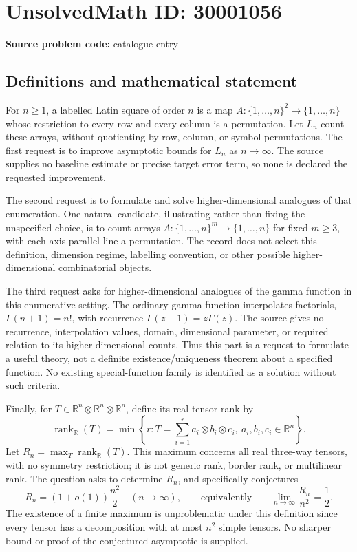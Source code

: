 \documentclass[11pt]{article}
\newcommand{\R}{\mathbb{R}}
\begin{document}
\section*{UnsolvedMath ID: 30001056}
\textbf{Source problem code:} catalogue entry
\subsection{Definitions and mathematical statement}
For \(n\geq1\), a labelled Latin square of order \(n\) is a map \(A:\{1,\ldots,n\}^2\to\{1,\ldots,n\}\) whose restriction to every row and every column is a permutation. Let \(L_n\) count these arrays, without quotienting by row, column, or symbol permutations. The first request is to improve asymptotic bounds for \(L_n\) as \(n\to\infty\). The source supplies no baseline estimate or precise target error term, so none is declared the requested improvement.

The second request is to formulate and solve higher-dimensional analogues of that enumeration. One natural candidate, illustrating rather than fixing the unspecified choice, is to count arrays \(A:\{1,\ldots,n\}^m\to\{1,\ldots,n\}\) for fixed \(m\geq3\), with each axis-parallel line a permutation. The record does not select this definition, dimension regime, labelling convention, or other possible higher-dimensional combinatorial objects.

The third request asks for higher-dimensional analogues of the gamma function in this enumerative setting. The ordinary gamma function interpolates factorials, \(\Gamma(n+1)=n!\), with recurrence \(\Gamma(z+1)=z\Gamma(z)\). The source gives no recurrence, interpolation values, domain, dimensional parameter, or required relation to its higher-dimensional counts. Thus this part is a request to formulate a useful theory, not a definite existence/uniqueness theorem about a specified function. No existing special-function family is identified as a solution without such criteria.

Finally, for \(T\in\R^n\otimes\R^n\otimes\R^n\), define its real tensor rank by
\[
 \operatorname{rank}_{\R}(T)=\min\left\{r:T=\sum_{i=1}^r a_i\otimes b_i\otimes c_i,
 \ a_i,b_i,c_i\in\R^n\right\}.
\]
Let \(R_n=\max_T\operatorname{rank}_{\R}(T)\). This maximum concerns all real three-way tensors, with no symmetry restriction; it is not generic rank, border rank, or multilinear rank. The question asks to determine \(R_n\), and specifically conjectures
\[
 R_n=(1+o(1))\frac{n^2}{2}\quad(n\to\infty),
 \qquad\text{equivalently}\qquad
 \lim_{n\to\infty}\frac{R_n}{n^2}=\frac12.
\]
The existence of a finite maximum is unproblematic under this definition since every tensor has a decomposition with at most \(n^2\) simple tensors. No sharper bound or proof of the conjectured asymptotic is supplied.
\end{document}
